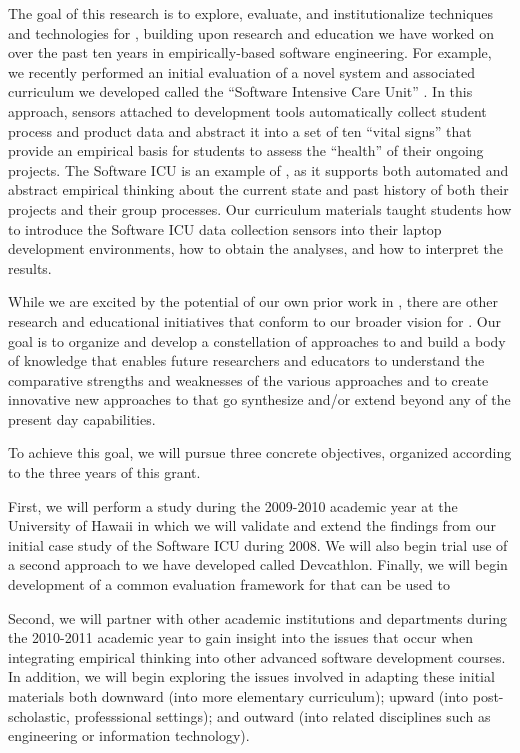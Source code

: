 The goal of this research is to explore, evaluate, and institutionalize
techniques and technologies for \eCT, building upon research and education
we have worked on over the past ten years in empirically-based software
engineering.  For example, we recently performed an initial evaluation of a
novel system and associated curriculum we developed called the ``Software
Intensive Care Unit'' \citep{csdl2-09-02}.  In this approach, sensors
attached to development tools automatically collect student process and
product data and abstract it into a set of ten ``vital signs'' that provide
an empirical basis for students to assess the ``health'' of their ongoing
projects.  The Software ICU is an example of \eCT, as it supports both
automated and abstract empirical thinking about the current state and past
history of both their projects and their group processes.  Our curriculum
materials taught students how to introduce the Software ICU data collection
sensors into their laptop development environments, how to obtain the
analyses, and how to interpret the results.

While we are excited by the potential of our own prior work in \eCT, there
are other research and educational initiatives that conform to our broader
vision for \eCT.  Our goal is to organize and develop a constellation of
approaches to \eCT and build a body of knowledge that enables future
researchers and educators to understand the comparative strengths and
weaknesses of the various approaches and to create innovative new
approaches to \eCT that go synthesize and/or extend beyond any of the
present day capabilities.

To achieve this goal, we will pursue three concrete objectives, organized
according to the three years of this grant.  

First, we will perform a study during the 2009-2010 academic year at the
University of Hawaii in which we will validate and extend the findings from
our initial case study of the Software ICU during 2008.  We will also begin
trial use of a second approach to \eCT we have developed called Devcathlon. 
Finally, we will begin development of a common evaluation framework for \eCT that
can be used to 

Second, we will partner with other academic institutions and departments
during the 2010-2011 academic year to gain insight into the issues that
occur when integrating empirical thinking into other advanced software
development courses.  In addition, we will begin exploring the issues
involved in adapting these initial materials both downward (into more
elementary curriculum); upward (into post-scholastic, professsional
settings); and outward (into related disciplines such as engineering or
information technology).

